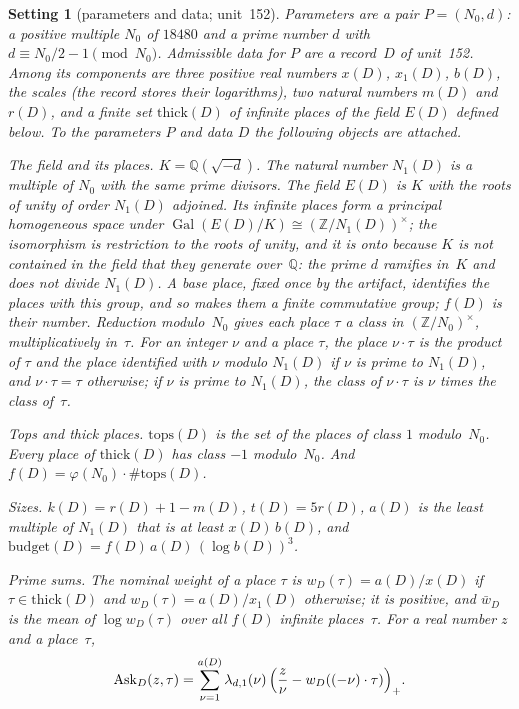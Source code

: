 \documentclass[11pt,a4paper]{article}
\newcommand{\Q}{\mathbb{Q}}
\newcommand{\Z}{\mathbb{Z}}
\newcommand{\Gal}{\operatorname{Gal}}
\theoremstyle{plainx}
\theoremstyle{uprightx}
\newtheorem{setting}[theorem]{Setting}          %
\newcommand{\scx}[1]{x(#1)}
\newcommand{\scxo}[1]{x_1(#1)}
\newcommand{\scb}[1]{b(#1)}
\newcommand{\Dm}[1]{m(#1)}
\newcommand{\Dr}[1]{r(#1)}
\newcommand{\tops}[1]{\mathrm{tops}(#1)}
\newcommand{\thick}[1]{\mathrm{thick}(#1)}
\newcommand{\budget}[1]{\mathrm{budget}(#1)}
\newcommand{\wD}[2]{w_{#1}(#2)}
\newcommand{\wbar}[1]{\bar{w}_{#1}}
\newcommand{\Ask}[3]{\mathrm{Ask}_{#1}(#2,#3)}
\begin{document}
\begin{setting}[parameters and data; unit~152]\label{st:data}
\emph{Parameters} are a pair $P=(N_0,d)$: a positive multiple $N_0$ of $18480$ and a prime number $d$ with
$d\equiv N_0/2-1\pmod{N_0}$. \emph{Admissible data} for $P$ are a record~$D$ of unit~152. Among its components are
three positive real numbers $\scx{D}$, $\scxo{D}$, $\scb{D}$, the \emph{scales} (the record stores their logarithms), two natural
numbers $\Dm{D}$ and $\Dr{D}$, and a finite set $\thick{D}$ of infinite places of the field $E(D)$ defined below. To the
parameters $P$ and data $D$ the following objects are attached.

\emph{The field and its places.} $K=\Q(\sqrt{-d})$. The natural number $N_1(D)$ is a multiple of $N_0$ with the same
prime divisors. The field
$E(D)$ is $K$ with the roots of unity of order $N_1(D)$ adjoined. Its infinite places form a principal homogeneous
space under $\Gal(E(D)/K)\cong(\Z/N_1(D))^{\times}$; the isomorphism is restriction to the roots of unity, and it is
onto because $K$ is not contained in the field that they generate over~$\Q$: the prime $d$ ramifies in~$K$ and does
not divide $N_1(D)$. A base place, fixed once by the artifact, identifies the places with this group, and so makes
them a finite commutative group; $f(D)$ is their number. Reduction modulo~$N_0$ gives each place $\tau$ a
\emph{class} in $(\Z/N_0)^{\times}$, multiplicatively in~$\tau$. For an integer $\nu$ and a place $\tau$, the place
$\nu\cdot\tau$ is the product of $\tau$ and the place identified with $\nu$ modulo $N_1(D)$ if $\nu$ is prime to
$N_1(D)$, and $\nu\cdot\tau=\tau$ otherwise; if $\nu$ is prime to $N_1(D)$, the class of $\nu\cdot\tau$ is $\nu$ times
the class of~$\tau$.

\emph{Tops and thick places.} $\tops{D}$ is the set of the places of class $1$ modulo~$N_0$. Every place of
$\thick{D}$ has class $-1$ modulo~$N_0$. And $f(D)=\varphi(N_0)\cdot\#\tops{D}$.

\emph{Sizes.} $k(D)=\Dr{D}+1-\Dm{D}$, $t(D)=5\Dr{D}$, $a(D)$ is the least multiple of $N_1(D)$ that is at least $\scx{D}\,\scb{D}$, and
$\budget{D}=f(D)\,a(D)\,(\log \scb{D})^{3}$.

\emph{Prime sums.} The \emph{nominal weight} of a place $\tau$ is $\wD{D}{\tau}=a(D)/\scx{D}$ if $\tau\in\thick{D}$ and
$\wD{D}{\tau}=a(D)/\scxo{D}$ otherwise; it is positive, and $\wbar{D}$ is the mean of $\log\wD{D}{\tau}$ over all $f(D)$
infinite places~$\tau$. For a real number $z$ and a place~$\tau$,
\[
\Ask{D}{z}{\tau}=\sum_{\nu=1}^{a(D)}\lambdaClass{d}{1}{\nu}\,\Bigl(\frac z\nu-\wD{D}{(-\nu)\cdot\tau}\Bigr)_{+}.
\]


\end{setting}
\end{document}
